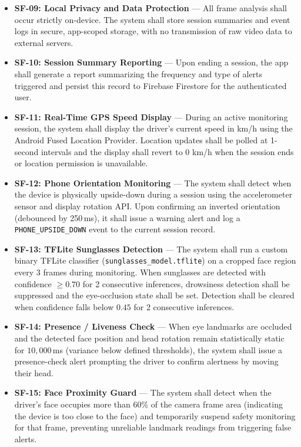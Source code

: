 \documentclass[11pt]{report}
\begin{document}
\begin{itemize}
    \item \textbf{SF-09: Local Privacy and Data Protection} —
    All frame analysis shall occur strictly on-device. The system shall store session summaries and event logs in secure, app-scoped storage, with no transmission of raw video data to external servers.

    \item \textbf{SF-10: Session Summary Reporting} —
    Upon ending a session, the app shall generate a report summarizing the frequency and type of alerts triggered and persist this record to Firebase Firestore for the authenticated user.

    \item \textbf{SF-11: Real-Time GPS Speed Display} —
    During an active monitoring session, the system shall display the driver's current speed in km/h using the Android Fused Location Provider. Location updates shall be polled at 1-second intervals and the display shall revert to 0 km/h when the session ends or location permission is unavailable.

    \item \textbf{SF-12: Phone Orientation Monitoring} —
    The system shall detect when the device is physically upside-down during a session using the accelerometer sensor and display rotation API. Upon confirming an inverted orientation (debounced by 250\,ms), it shall issue a warning alert and log a \texttt{PHONE\_UPSIDE\_DOWN} event to the current session record.

    \item \textbf{SF-13: TFLite Sunglasses Detection} —
    The system shall run a custom binary TFLite classifier (\texttt{sunglasses\_model.tflite}) on a cropped face region every 3 frames during monitoring. When sunglasses are detected with confidence $\geq 0.70$ for 2 consecutive inferences, drowsiness detection shall be suppressed and the eye-occlusion state shall be set. Detection shall be cleared when confidence falls below $0.45$ for 2 consecutive inferences.

    \item \textbf{SF-14: Presence / Liveness Check} —
    When eye landmarks are occluded and the detected face position and head rotation remain statistically static for $10{,}000$\,ms (variance below defined thresholds), the system shall issue a presence-check alert prompting the driver to confirm alertness by moving their head.

    \item \textbf{SF-15: Face Proximity Guard} —
    The system shall detect when the driver's face occupies more than 60\% of the camera frame area (indicating the device is too close to the face) and temporarily suspend safety monitoring for that frame, preventing unreliable landmark readings from triggering false alerts.
\end{itemize}
\end{document}
